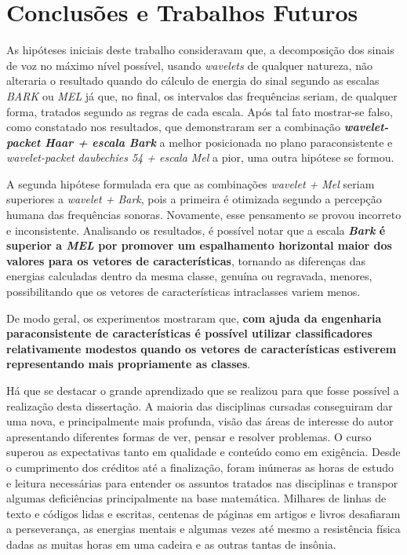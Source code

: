 \chapter{Conclusões e Trabalhos Futuros}
\label{chap:conclusions}
	\par As hipóteses iniciais deste trabalho consideravam que, a decomposição dos sinais de voz no máximo nível possível, usando \textit{wavelets} de qualquer natureza, não alteraria o resultado quando do cálculo de energia do sinal segundo as escalas \textit{BARK} ou \textit{MEL} já que, no final, os intervalos das frequências seriam, de qualquer forma, tratados segundo as regras de cada escala. Após tal fato mostrar-se falso, como constatado nos resultados, que demonstraram ser a combinação \textbf{\textit{wavelet-packet Haar + escala Bark}} a melhor posicionada no plano paraconsistente e \textit{wavelet-packet daubechies 54 + escala Mel} a pior, uma outra hipótese se formou.
	
	\par A segunda hipótese formulada era que as combinações \textit{wavelet + Mel} seriam superiores a \textit{wavelet + Bark}, pois a primeira é otimizada segundo a percepção humana das frequências sonoras. Novamente, esse pensamento se provou incorreto e inconsistente. Analisando os resultados, é possível notar que a escala \textbf{\textit{Bark} é superior a \textit{MEL} por promover um espalhamento horizontal maior dos valores para os vetores de características}, tornando as diferenças das energias calculadas dentro da mesma classe, genuína ou regravada, menores, possibilitando que os vetores de características intraclasses variem menos.

    \par De modo geral, os experimentos mostraram que, \textbf{com ajuda da engenharia paraconsistente de características é possível utilizar classificadores relativamente modestos quando os vetores de características estiverem representando mais propriamente as classes}.
    
    \par Há que se destacar o grande aprendizado que se realizou para que fosse possível a realização desta dissertação. A maioria das disciplinas cursadas conseguiram dar uma nova, e principalmente mais profunda, visão das áreas de interesse do autor apresentando diferentes formas de ver, pensar e resolver problemas. O curso superou as expectativas tanto em qualidade e conteúdo como em exigência. Desde o cumprimento dos créditos até a finalização, foram inúmeras as horas de estudo e leitura necessárias para entender os assuntos tratados nas disciplinas e transpor algumas deficiências principalmente na base matemática. Milhares de linhas de texto e códigos lidas e escritas, centenas de páginas em artigos e livros desafiaram a perseverança, as energias mentais e algumas vezes até mesmo a resistência física dadas as muitas horas em uma cadeira e as outras tantas de insônia.
    
